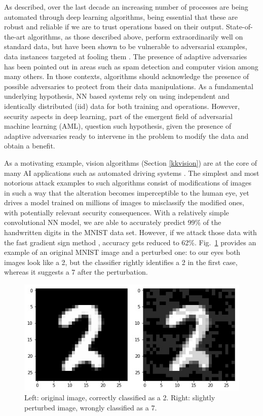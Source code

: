 As described, over the last decade
an increasing number of processes are being automated through 
deep learning algorithms, being 
essential that these are robust and reliable
if we are to
trust operations based on their output. State-of-the-art
algorithms, as those described above, perform extraordinarily well on standard data,  but have been
shown to be vulnerable to adversarial examples, data instances targeted at
fooling them \citep{goodfellow2014explaining}.
The presence of adaptive adversaries has
been pointed out in areas such as spam detection \citep{zeager2017adversarial}
and computer vision \citep{goodfellow2014explaining} among many others. 
In those contexts, algorithms should acknowledge the presence of possible adversaries
to protect from their data manipulations.
As a fundamental underlying hypothesis, NN
based systems rely on using 
independent and identically distributed (iid) data for both training and operations. However, security aspects in deep
learning, part of the emergent field of
adversarial machine learning (AML),
question such hypothesis, given the
presence of adaptive adversaries ready to  intervene in the problem 
to modify the data and obtain a benefit. 

As a motivating example, vision algorithms (Section
\ref{kkvision}) are at the core of many AI 
applications such as automated driving systems \citep{rumanos}. 
The simplest and most notorious attack examples to
such algorithms  
consist of modifications of images in such a way that the alteration becomes imperceptible to the human eye, yet drives a model trained on millions of images to misclassify the modified ones,
with potentially relevant security consequences.
With a relatively simple convolutional NN model, we are able to accurately predict 99\% of the handwritten digits in the MNIST data set.
However, if we attack those data with the fast gradient sign method \citep{szegedy2013intriguin},
accuracy gets reduced to 62\%. Fig.~\ref{fig:digits} provides an example of an original MNIST image and a perturbed one: to our eyes both images look like a 2, but the classifier rightly identifies a 2 in the first case, whereas it suggests a 7 after the perturbation. 
%
%
%
\begin{figure}[hbt]
\centering
  \includegraphics[width=.6\linewidth]{figures/27}
  \caption{Left: original image, correctly classified as a 2. Right: slightly perturbed image, wrongly classified as a 7.}
  \label{fig:digits}
\end{figure}

